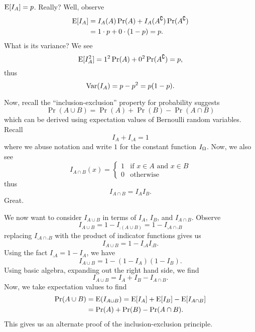 $\mathrm{E}[I_{A}]=p$. Really? Well, observe
\begin{equation}
\begin{split}
\mathrm{E}[I_A] &= I_A(A)\mathop{\mathrm{Pr}}\nolimits(A)+I_A({A}^{\complement})\mathop{\mathrm{Pr}}\nolimits({A}^{\complement})\\
&= 1\cdot p + 0\cdot(1-p) = p.
\end{split}
\end{equation}
What is its variance? We see
\begin{equation}
\mathrm{E}[I_{A}^{2}]=1^{2}\mathop{\mathrm{Pr}}\nolimits(A)+0^{2}\mathop{\mathrm{Pr}}\nolimits({A}^{\complement})=p,
\end{equation}
thus
\begin{equation}
\mathop{\mathrm{Var}}\nolimits(I_A)=p-p^{2}=p(1-p).
\end{equation}

\M
Now, recall the ``inclusion-exclusion'' property for probability suggests
\begin{equation}
\Pr(A\cup B)=\Pr(A)+\Pr(B)-\Pr(A\cap B)
\end{equation}
which can be derived using expectation values of Bernoulli random variables. 
Recall
\begin{equation}
I_{A}+I_{\comp{A}}=1
\end{equation}
where we abuse notation and write $1$ for the constant function $I_\Omega$. 
Now, we also see
\begin{equation}
I_{A\cap B}(x)=\begin{cases}1 & \mbox{if }x\in A\mbox{ and }x\in B\\
0 & \mbox{otherwise}
\end{cases}
\end{equation}
thus
\begin{equation}
I_{A\cap B}=I_{A}I_{B}.
\end{equation}
Great.

We now want to consider $I_{A\cup B}$ in terms of $I_{A}$, $I_{B}$, 
and $I_{A\cap B}$. Observe
\begin{equation}
I_{A\cup B} = 1-I_{\comp{(A\cup B)}}=1-I_{\comp{A}\cap\comp{B}}
\end{equation}
replacing $I_{\comp{A}\cap\comp{B}}$ with the product of indicator functions
gives us
\begin{equation}
I_{A\cup B}=1-I_{\comp{A}}I_{\comp{B}}.
\end{equation}
Using the fact $I_{\comp{A}}=1-I_{A}$, we have
\begin{equation}
I_{A\cup B}=1-(1-I_{A})(1-I_{B}).
\end{equation}
Using basic algebra, expanding out the right hand side, we find
\begin{equation}
I_{A\cup B}=I_{A}+I_{B}-I_{A\cap B}.
\end{equation}
Now, we take expectation values to find
\begin{equation}
\begin{split}
\mathop{\mathrm{Pr}}\nolimits(A\cup B) &=\mathrm{E}(I_{A\cup B}) 
= \mathrm{E}[I_A]+\mathrm{E}[I_B]-\mathrm{E}[I_{A\cap B}]\\
&=\mathop{\mathrm{Pr}}\nolimits(A)+\mathop{\mathrm{Pr}}\nolimits(B)-\mathop{\mathrm{Pr}}\nolimits(A\cap B).
\end{split}
\end{equation}
This gives us an alternate proof of the inclusion-exclusion principle.

